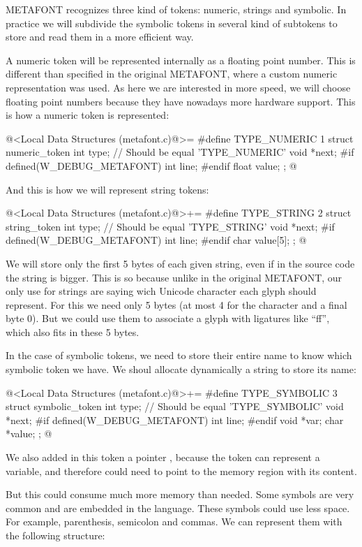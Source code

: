 METAFONT recognizes three kind of tokens: numeric, strings and
symbolic. In practice we will subdivide the symbolic tokens in several
kind of subtokens to store and read them in a more efficient way.

A numeric token will be represented internally as a floating point
number. This is different than specified in the original METAFONT,
where a custom numeric representation was used. As here we are
interested in more speed, we will choose floating point numbers
because they have nowadays more hardware support. This is how a
numeric token is represented:

\iniciocodigo
@<Local Data Structures (metafont.c)@>=
#define TYPE_NUMERIC 1
struct numeric_token{
  int type;   // Should be equal 'TYPE_NUMERIC'
  void *next;
#if defined(W_DEBUG_METAFONT)
  int line;
#endif
  float value;
};
@
\fimcodigo

And this is how we will represent string tokens:

\iniciocodigo
@<Local Data Structures (metafont.c)@>+=
#define TYPE_STRING 2
struct string_token{
  int type;   // Should be equal 'TYPE_STRING'
  void *next;
#if defined(W_DEBUG_METAFONT)
  int line;
#endif
  char value[5];
};
@
\fimcodigo

We will store only the first 5 bytes of each given string, even if in
the source code the string is bigger. This is so because unlike in the
original METAFONT, our only use for strings are saying wich Unicode
character each glyph should represent. For this we need only 5 bytes
(at most 4 for the character and a final byte 0). But we could use
them to associate a glyph with ligatures like ``ff'', which also fits
in these 5 bytes.

In the case of symbolic tokens, we need to store their entire name to
know which symbolic token we have. We shoul allocate dynamically
a string to store its name:

\iniciocodigo
@<Local Data Structures (metafont.c)@>+=
#define TYPE_SYMBOLIC 3
struct symbolic_token{
  int type;   // Should be equal 'TYPE_SYMBOLIC'
  void *next;
#if defined(W_DEBUG_METAFONT)
  int line;
#endif
  void *var;
  char *value;
};
@
\fimcodigo

We also added in this token a pointer , because the
token can represent a variable, and therefore could need to point to
the memory region with its content.

But this could consume much more memory than needed. Some symbols are
very common and are embedded in the language. These symbols could use
less space. For example, parenthesis, semicolon and commas. We can
represent them with the following structure:

